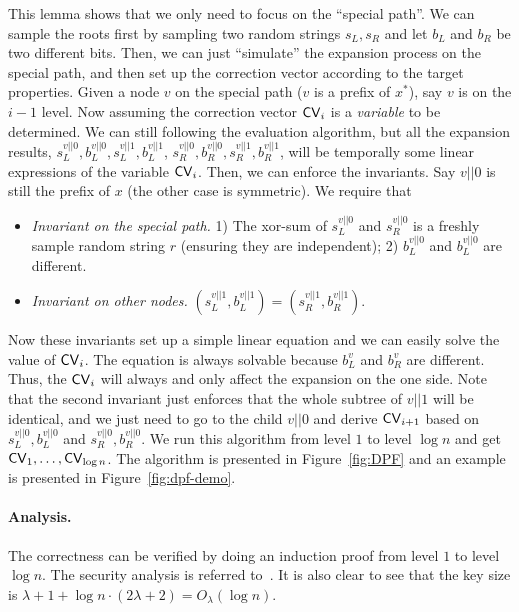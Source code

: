 This lemma shows that we only need to focus on the ``special path''. We can sample the roots first by sampling two random strings $s_L,s_R$ and let $b_L$ and $b_R$ be two different bits. 
Then, we can just ``simulate'' the expansion process on the special path, and then set up the correction vector according to the target properties. 
Given a node $v$ on the special path ($v$ is a prefix of $x^*$), say $v$ is on the $i-1$ level.
Now assuming the correction vector ${\sf CV}_i$ is a \textit{variable} to be determined.
We can still following the evaluation algorithm, but all the expansion results, $s^{v||0}_L, b^{v||0}_L, s^{v||1}_L, b^{v||1}_L$, $s^{v||0}_R, b^{v||0}_R, s^{v||1}_R, b^{v||1}_R$, will be temporally some linear expressions of the variable ${\sf CV}_i$.
Then, we can enforce the invariants.
Say $v||0$ is still the prefix of $x$ (the other case is symmetric). We require that 
\begin{itemize}
    \item \textit{Invariant on the special path.} 1) The xor-sum of $s^{v||0}_L$ and $s^{v||0}_R$ is a freshly sample random string $r$ (ensuring they are independent); 2) $b^{v||0}_L$ and $b^{v||0}_L$ are different.
    \item \textit{Invariant on other nodes.} $(s^{v||1}_L,b^{v||1}_L)=(s^{v||1}_R,b^{v||1}_R)$.
\end{itemize}
Now these invariants set up a simple linear equation and we can easily solve the value of ${\sf CV}_i$.
The equation is always solvable because $b^v_L$ and $b^v_R$ are different.
Thus, the ${\sf CV}_i$ will always and only affect the expansion on the one side.
Note that the second invariant just enforces that the whole subtree of $v||1$ will be identical, and we just need to go to the child $v||0$ and derive ${\sf CV}_{i+1}$ based on $s^{v||0}_L, b^{v||0}_L$ and $s^{v||0}_R, b^{v||0}_R$.
We run this algorithm from level $1$ to level $\log n$ and get ${\sf CV}_1,\dots,{\sf CV}_{\log n}$.
The algorithm is presented in Figure~\ref{fig:DPF} and an example is presented in Figure~\ref{fig:dpf-demo}.


\paragraph{Analysis.}
The correctness can be verified by doing an induction proof from level $1$ to level $\log n$.
The security analysis is referred to~\cite{boyle2016function}. 
It is also clear to see that the key size is $\lambda+1+\log n\cdot (2\lambda+2)=O_\lambda(\log n)$.



